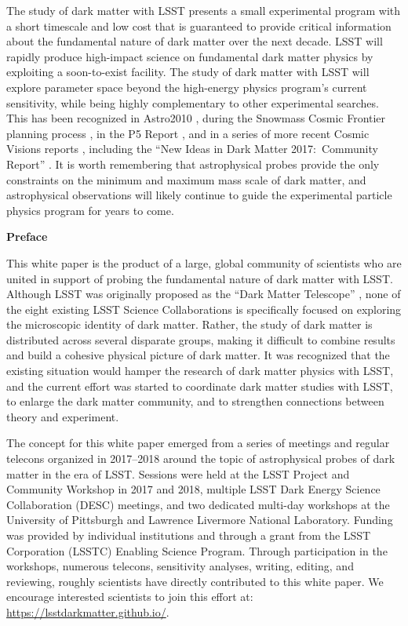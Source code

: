 The study of dark matter with LSST presents a small experimental program with a short timescale and low cost that is guaranteed to provide critical information about the fundamental nature of dark matter over the next decade.
LSST will rapidly produce high-impact science on fundamental dark matter physics by exploiting a soon-to-exist facility. 
The study of dark matter with LSST will explore parameter space beyond the high-energy physics program's current sensitivity, while being highly complementary to other experimental searches. %
This has been recognized in Astro2010 \citep{Astro2010}, during the Snowmass Cosmic Frontier planning process \citep[\eg,][]{1310.8642, 1310.5662, 1305.1605}, in the P5 Report \citep[]{P5Report}, and in a series of more recent Cosmic Visions reports \citep[\eg,][]{1604.07626,1802.07216}, including the ``New Ideas in Dark Matter 2017:\ Community Report'' \citep{Battaglieri:2017aum}.
It is worth remembering that astrophysical probes provide the only constraints on the minimum and maximum mass scale of dark matter, and astrophysical observations will likely continue to guide the experimental particle physics program for years to come.

\clearpage

\begin{center}
  {\Large \bf Preface}
\end{center}

This white paper is the product of a large, global community of scientists who are united in support of probing the fundamental nature of dark matter with LSST.
Although LSST was originally proposed as the ``Dark Matter Telescope'' \citep{Tyson:2001}, none of the eight existing LSST Science Collaborations is specifically focused on exploring the microscopic identity of dark matter.
Rather, the study of dark matter is distributed across several disparate groups, making it difficult to combine results and build a cohesive physical picture of dark matter.
It was recognized that the existing situation would hamper the research of dark matter physics with LSST, and the current effort was started to coordinate dark matter studies with LSST, to enlarge the dark matter community, and to strengthen connections between theory and experiment.

The concept for this white paper emerged from a series of meetings and regular telecons organized in 2017--2018 around the topic of astrophysical probes of dark matter in the era of LSST.
Sessions were held at the LSST Project and Community Workshop in 2017 and 2018, multiple LSST Dark Energy Science Collaboration (DESC) meetings, and two dedicated multi-day workshops at the University of Pittsburgh and Lawrence Livermore National Laboratory.
Funding was provided by individual institutions and through a grant from the LSST Corporation (LSSTC) Enabling Science Program.
Through participation in the workshops, numerous telecons, sensitivity analyses, writing, editing, and reviewing, roughly  scientists have directly contributed to this white paper.
We encourage interested scientists to join this effort at: \url{https://lsstdarkmatter.github.io/}.


